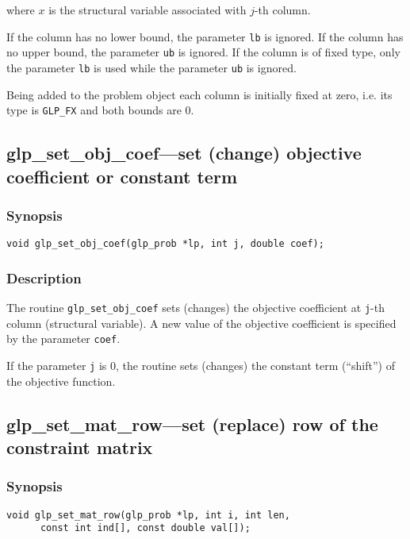 \noindent
where $x$ is the structural variable associated with $j$-th column.

If the column has no lower bound, the parameter \verb|lb| is ignored.
If the column has no upper bound, the parameter \verb|ub| is ignored.
If the column is of fixed type, only the parameter \verb|lb| is used
while the parameter \verb|ub| is ignored.

Being added to the problem object each column is initially fixed at
zero, i.e. its type is \verb|GLP_FX| and both bounds are 0.

\subsection{glp\_set\_obj\_coef---set (change) objective coefficient
or constant term}

\subsubsection*{Synopsis}

\begin{verbatim}
void glp_set_obj_coef(glp_prob *lp, int j, double coef);
\end{verbatim}

\subsubsection*{Description}

The routine \verb|glp_set_obj_coef| sets (changes) the objective
coefficient at \verb|j|-th column (structural variable). A new value of
the objective coefficient is specified by the parameter \verb|coef|.

If the parameter \verb|j| is 0, the routine sets (changes) the constant
term (``shift'') of the objective function.

\subsection{glp\_set\_mat\_row---set (replace) row of the constraint
matrix}

\subsubsection*{Synopsis}

\begin{verbatim}
void glp_set_mat_row(glp_prob *lp, int i, int len,
      const int ind[], const double val[]);
\end{verbatim}

